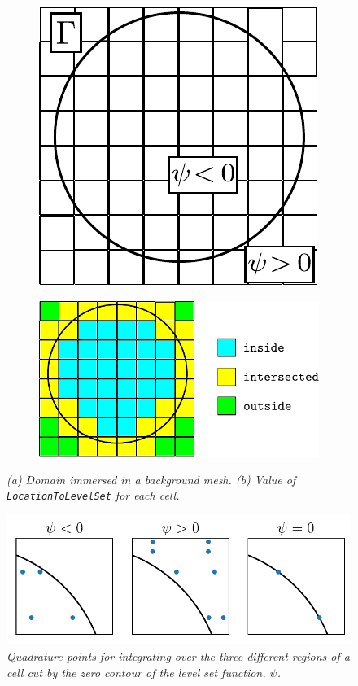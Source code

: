 \documentclass{ansarticle-preprint}
\begin{document}
\begin{figure}
  \centering
  \begin{subfigure}[b]{0.3\textwidth}
    \centering
    \includegraphics[height=.12\paperheight]{svg/immersed-domain.pdf}
    \caption{\label{fig:immersed-domain}}
  \end{subfigure}
  \qquad
  \begin{subfigure}[b]{0.3\textwidth}
    \centering
    \includegraphics[height=.12\paperheight]{svg/location-to-level-set.pdf}
    \caption{ \label{fig:location-to-level-set}}
  \end{subfigure}
  \caption{\it (a) Domain immersed in a background mesh. (b) Value of \texttt{LocationToLevelSet} for each cell.}
%
  \centering
  \includegraphics[width=.4\paperwidth]{svg/immersed_quadratures.pdf}
  \caption{\it Quadrature points for integrating over the three different regions of a cell cut by the zero contour of the level set function, $\psi$. \label{fig:immersed_quadratures}}
\end{figure}
\end{document}
